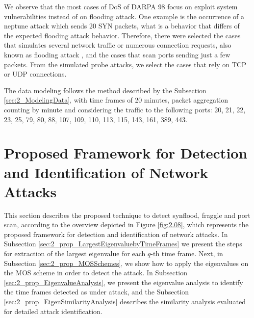 We observe that the most cases of DoS of DARPA 98 focus on exploit system vulnerabilities instead of on flooding attack. One example is the occurrence of a neptune attack which sends 20 SYN packets, what is a behavior that differs of the expected flooding attack behavior. Therefore, there were selected the cases that simulates several network traffic or numerous connection requests, also known as flooding attack \cite{ahmed2016survey,osanaiye2016distributed}, and the cases that scan ports sending just a few packets. From the simulated probe attacks, we select the cases that rely on TCP or UDP connections.

The data modeling follows the method described by the Subsection \ref{sec:2_ModelingData}, with time frames of 20 minutes, packet aggregation counting by minute and considering the traffic to the following ports: 20, 21, 22, 23, 25, 79, 80, 88, 107, 109, 110, 113, 115, 143, 161, 389, 443.

\section{Proposed Framework for Detection and Identification of Network Attacks}
\label{sec:2_prop_getv}

This section describes the proposed technique to detect synflood, fraggle and port scan, according to the overview depicted in Figure \ref{fig:2.08}, which represents the proposed framework for detection and identification of network attacks. In Subsection \ref{sec:2_prop_LargestEigenvaluebyTimeFrames} we present the steps for extraction of the largest eigenvalue for each $q$-th time frame. Next, in Subsection \ref{sec:2_prop_MOSSchemes}, we show how to apply the eigenvalues on the MOS scheme in order to detect the attack. In Subsection \ref{sec:2_prop_EigenvalueAnalysis}, we present the eigenvalue analysis to identify the time frames detected as under attack, and the Subsection \ref{sec:2_prop_EigenSimilarityAnalysis} describes the similarity analysis evaluated for detailed attack identification.

